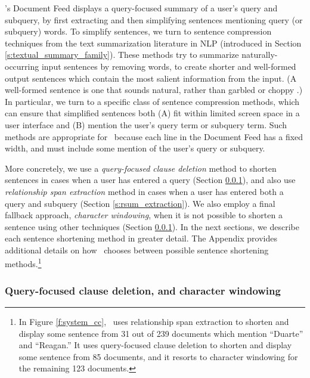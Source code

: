 \ours's Document Feed displays a query-focused summary of a user's query and subquery, by first extracting and then simplifying sentences mentioning query (or subquery) words.
To simplify sentences, we turn to sentence compression techniques from the text summarization literature in NLP (introduced in Section \ref{s:textual_summary_family}).
These methods try to summarize naturally-occurring input sentences by removing words, to create shorter and well-formed output sentences which contain the most salient information from the input.
(A well-formed sentence is one that sounds natural, rather than garbled or choppy \cite{sprouseschutzeintro}.)
In particular, we turn to a specific class of sentence compression methods, which can ensure that simplified sentences both (A) fit within limited screen space in a user interface and (B) mention the user's query term or subquery term. 
Such methods are appropriate for \ours~because each line in the Document Feed has a fixed width, and must include some mention of the user's query or subquery.

More concretely, we use a \textit{query-focused clause deletion} \cite{Handler2019HumanAJ,Handler2019Query} method to shorten sentences in cases when a user has entered a query (Section \ref{s:clause_deletion}),
and also use \textit{relationship span extraction} method \cite{handler-oconnor-2018-relational} in cases when a user has entered both a query and subquery (Section \ref{s:rsum_extraction}).
We also employ a final fallback approach, \textit{character windowing},
when it is not possible to shorten a sentence using other techniques (Section \ref{s:clause_deletion}).
In the next sections, we describe each sentence shortening method in greater detail. The Appendix provides additional details on how \ours~chooses between possible sentence shortening methods.\footnote{
In Figure \ref{f:system_cc}, \ours~uses relationship span extraction to shorten and display some sentence from 31 out of 239 documents which mention ``Duarte'' and ``Reagan.'' 
It uses query-focused clause deletion to shorten and display some sentence from 85 documents, and it resorts to character windowing for the remaining 123 documents.\label{footnote_counts}}

\subsubsection{Query-focused clause deletion, and character windowing}\label{s:clause_deletion}

